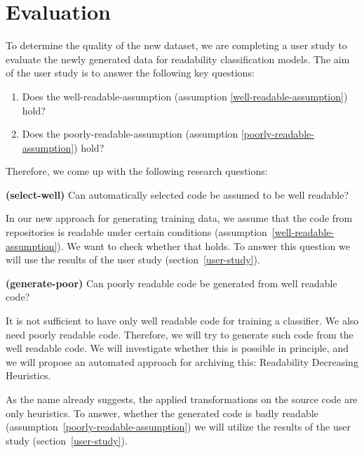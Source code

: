 \documentclass[%
class=scrreprt,
chapterprefix=false,%
open=right,%
twoside=false,%
paper=a4,%
logofile={Logo\_zentral\_farbig\_EN.png},%
thesistype=master,%
UKenglish,%
]{se2thesis}
\theoremstyle{definition}
\begin{document}
	
\section{Evaluation} \label{Evaluation}

	To determine the quality of the new dataset, we are completing a user study to evaluate the newly generated data for readability classification models.
	The aim of the user study is to answer the following key questions:
	\begin{enumerate}
		\item Does the well-readable-assumption (assumption \ref{well-readable-assumption}) hold?
		\item Does the poorly-readable-assumption (assumption \ref{poorly-readable-assumption}) hold?
	\end{enumerate}

	Therefore, we come up with the following research questions:
	
	\begin{resq} \textbf{(select-well)} Can automatically selected code be assumed to be well readable?\end{resq} \label{select-well}
	In our new approach for generating training data, we assume that the code from repositories is readable under certain conditions (assumption~\ref{well-readable-assumption}). We want to check whether that holds. To answer this question we will use the results of the user study (section~\ref{user-study}).
	
	\begin{resq} \textbf{(generate-poor)} Can poorly readable code be generated from well readable code?\end{resq} \label{generate-poor}
	It is not sufficient to have only well readable code for training a classifier. We also need poorly readable code. Therefore, we will try to generate such code from the well readable code. We will investigate whether this is possible in principle, and we will propose an automated approach for archiving this: Readability Decreasing Heuristics.
	
	As the name already suggests, the applied transformations on the source code are only heuristics. To answer, whether the generated code is badly readable (assumption~\ref{poorly-readable-assumption}) we will utilize the results of the user study (section~\ref{user-study}).
	
	
\end{document}
